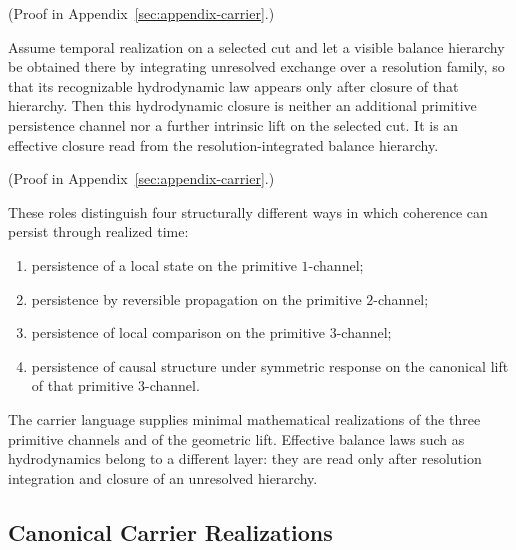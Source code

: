(Proof in Appendix~\ref{sec:appendix-carrier}.)

\begin{theorem}
\label{thm:resolution_integrated_balance_closure_not_intrinsic_mode}
Assume temporal realization on a selected cut and let a visible balance
hierarchy be obtained there by integrating unresolved exchange over a
resolution family, so that its recognizable hydrodynamic law appears only
after closure of that hierarchy. Then this hydrodynamic closure is neither an
additional primitive persistence channel nor a further intrinsic lift on the
selected cut. It is an effective closure read from the
resolution-integrated balance hierarchy.
\end{theorem}

(Proof in Appendix~\ref{sec:appendix-carrier}.)

\begin{remark}
\label{rem:persistence-mode-physical-reading}
These roles distinguish four structurally different ways in which coherence can
persist through realized time:
\begin{enumerate}[label=(\roman*), leftmargin=2em, itemsep=0.2em]
\item persistence of a local state on the primitive \(1\)-channel;
\item persistence by reversible propagation on the primitive \(2\)-channel;
\item persistence of local comparison on the primitive \(3\)-channel;
\item persistence of causal structure under symmetric response on the
      canonical lift of that primitive \(3\)-channel.
\end{enumerate}
The carrier language supplies minimal mathematical realizations of the three
primitive channels and of the geometric lift. Effective balance laws such as
hydrodynamics belong to a different layer: they are read only after
resolution integration and closure of an unresolved hierarchy.
\end{remark}

\subsection{Canonical Carrier Realizations}

